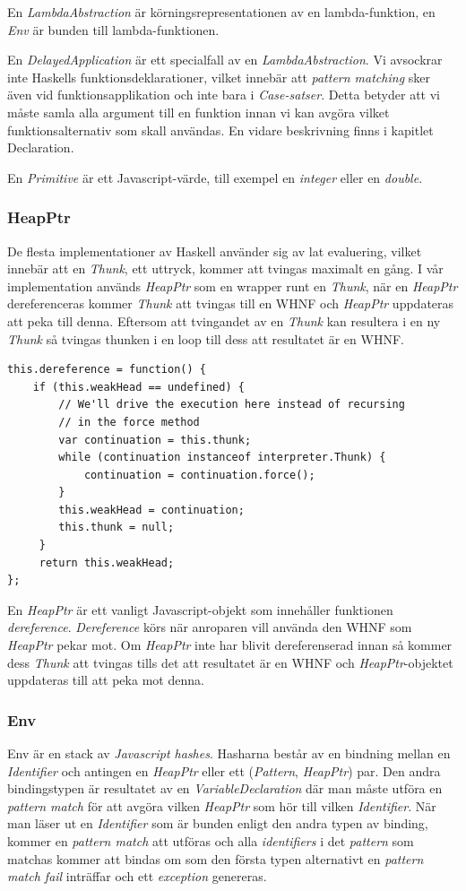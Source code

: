 En \emph{LambdaAbstraction} är körningsrepresentationen av en lambda-funktion, en \emph{Env} är bunden till lambda-funktionen.

En \emph{DelayedApplication} är ett specialfall av en \emph{LambdaAbstraction}. Vi avsockrar inte Haskells funktionsdeklarationer, vilket innebär att \emph{pattern matching} sker även vid funktionsapplikation och inte bara i \emph{Case-satser}. Detta betyder att vi måste samla alla argument till en funktion innan vi kan avgöra vilket funktionsalternativ som skall användas. En vidare beskrivning finns i kapitlet Declaration.

En \emph{Primitive} är ett Javascript-värde, till exempel en \emph{integer} eller en \emph{double}.

\subsubsection{HeapPtr}
De flesta implementationer av Haskell använder sig av lat evaluering, vilket innebär att en \emph{Thunk}, ett uttryck, kommer att tvingas maximalt en gång. I vår implementation används \emph{HeapPtr} som en wrapper runt en \emph{Thunk}, när en \emph{HeapPtr} dereferenceras kommer \emph{Thunk} att tvingas till en WHNF och \emph{HeapPtr} uppdateras att peka till denna. Eftersom att tvingandet av en \emph{Thunk} kan resultera i en ny \emph{Thunk} så tvingas thunken i en loop till dess att resultatet är en WHNF.

\begin{lstlisting}
this.dereference = function() {
    if (this.weakHead == undefined) {
        // We'll drive the execution here instead of recursing 
        // in the force method
        var continuation = this.thunk;
        while (continuation instanceof interpreter.Thunk) {
            continuation = continuation.force();
        }
        this.weakHead = continuation;
        this.thunk = null;
     }
     return this.weakHead;
};
\end{lstlisting}
En \emph{HeapPtr} är ett vanligt Javascript-objekt som innehåller funktionen \emph{dereference}. \emph{Dereference} körs när anroparen vill använda den WHNF som \emph{HeapPtr} pekar mot. Om \emph{HeapPtr} inte har blivit dereferenserad innan så kommer dess \emph{Thunk} att tvingas tills det att resultatet är en WHNF och \emph{HeapPtr}-objektet uppdateras till att peka mot denna.

\subsubsection{Env}
Env är en stack av \emph{Javascript hashes}. Hasharna består av en bindning mellan en \emph{Identifier} och antingen en \emph{HeapPtr} eller ett (\emph{Pattern}, \emph{HeapPtr}) par.  Den andra bindingstypen är resultatet av en \emph{VariableDeclaration} där man måste utföra en \emph{pattern match} för att avgöra vilken \emph{HeapPtr} som hör till vilken \emph{Identifier}. När man läser ut en \emph{Identifier} som är bunden enligt den andra typen av binding, kommer en \emph{pattern match} att utföras och alla \emph{identifiers} i det \emph{pattern} som matchas kommer att bindas om som den första typen alternativt en \emph{pattern match fail} inträffar och ett \emph{exception} genereras.

